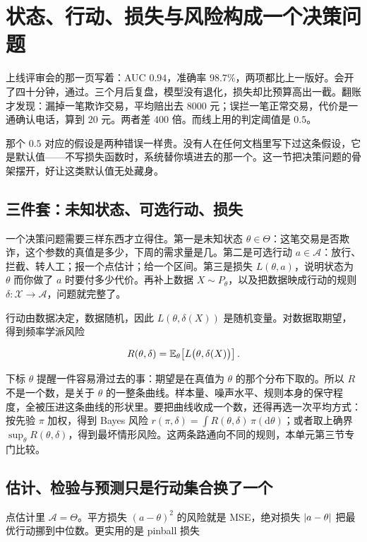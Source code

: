 \section{状态、行动、损失与风险构成一个决策问题}
\label{sec:11-Mathematical-Statistics/07-Statistical-Decision-and-Reliable-Prediction/01}

上线评审会的那一页写着：AUC \(0.94\)，准确率 \(98.7\%\)，两项都比上一版好。会开了四十分钟，通过。三个月后复盘，模型没有退化，损失却比预算高出一截。翻账才发现：漏掉一笔欺诈交易，平均赔出去 \(8000\) 元；误拦一笔正常交易，代价是一通确认电话，算到 \(20\) 元。两者差 \(400\) 倍。而线上用的判定阈值是 \(0.5\)。

那个 \(0.5\) 对应的假设是两种错误一样贵。没有人在任何文档里写下过这条假设，它是默认值——不写损失函数时，系统替你填进去的那一个。这一节把决策问题的骨架摆开，好让这类默认值无处藏身。

\subsection{三件套：未知状态、可选行动、损失}

一个决策问题需要三样东西才立得住。第一是未知状态 \(\theta\in\Theta\)：这笔交易是否欺诈，这个参数的真值是多少，下周的需求量是几。第二是可选行动 \(a\in\mathcal A\)：放行、拦截、转人工；报一个点估计；给一个区间。第三是损失 \(L(\theta,a)\)，说明状态为 \(\theta\) 而你做了 \(a\) 时要付多少代价。再补上数据 \(X\sim P_\theta\)，以及把数据映成行动的规则 \(\delta:\mathcal X\to\mathcal A\)，问题就完整了。

行动由数据决定，数据随机，因此 \(L(\theta,\delta(X))\) 是随机变量。对数据取期望，得到频率学派风险

\[
R(\theta,\delta)=\mathbb{E}_\theta\!\left[L\bigl(\theta,\delta(X)\bigr)\right].
\]

下标 \(\theta\) 提醒一件容易滑过去的事：期望是在真值为 \(\theta\) 的那个分布下取的。所以 \(R\) 不是一个数，是关于 \(\theta\) 的一整条曲线。样本量、噪声水平、规则本身的保守程度，全被压进这条曲线的形状里。要把曲线收成一个数，还得再选一次平均方式：按先验 \(\pi\) 加权，得到 Bayes 风险 \(r(\pi,\delta)=\int R(\theta,\delta)\,\pi(\mathrm d\theta)\)；或者取上确界 \(\sup_\theta R(\theta,\delta)\)，得到最坏情形风险。这两条路通向不同的规则，本单元第三节专门比较。

\subsection{估计、检验与预测只是行动集合换了一个}

点估计里 \(\mathcal A=\Theta\)。平方损失 \((a-\theta)^2\) 的风险就是 MSE，绝对损失 \(\left|a-\theta\right|\) 把最优行动挪到中位数。更实用的是 pinball 损失

